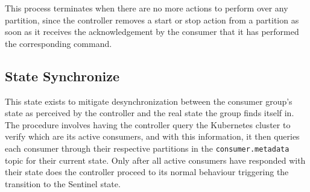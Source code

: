 This process terminates when there are no more actions to perform over any
partition, since the controller removes a start or stop action from a partition
as soon as it receives the acknowledgement by the consumer that it has performed
the corresponding command.

\subsection{State Synchronize}

This state exists to mitigate desynchronization between the consumer group's
state as perceived by the controller and the real state the group finds itself
in. The procedure involves having the controller query the Kubernetes cluster to
verify which are its active consumers, and with this information, it then
queries each consumer through their respective partitions in the
\lstinline{consumer.metadata} topic for their current state.  Only after all
active consumers have responded with their state does the controller proceed to
its normal behaviour triggering the transition to the Sentinel state. 
